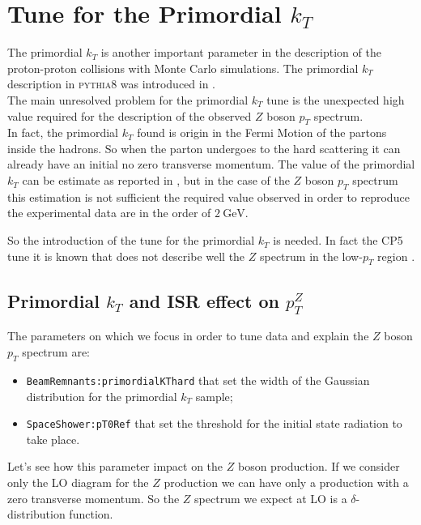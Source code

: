 \chapter{Tune for the Primordial $k_T$}
\label{chap:primordialkTtune}

The primordial $k_T$ is another important parameter in the description of the proton-proton collisions with Monte Carlo simulations. The primordial $k_T$ description in \textsc{pythia8} was introduced in .
\\
The main unresolved problem for the primordial $k_T$ tune is the unexpected high value required for the description of the observed $Z$ boson $p_T$ spectrum.
\\
In fact, the primordial $k_T$ found is origin in the Fermi Motion of the partons inside the hadrons. So when the parton undergoes to the hard scattering it can already have an initial no zero transverse momentum.
The value of the primordial $k_T$ can be estimate as reported in , but in the case of the $Z$ boson $p_T$ spectrum this estimation is not sufficient the required value observed in order to reproduce the experimental data are in the order of $2\ \mathrm{GeV}$.


So the introduction of the tune for the primordial $k_T$ is needed. In fact the CP5 tune it is known that does not describe well the $Z$ spectrum in the low-$p_T$ region \cite{CPtunes}.





\section{Primordial $k_T$ and ISR effect on $p_T^Z$}

The parameters on which we focus in order to tune data and explain the $Z$ boson $p_T$ spectrum are:
\begin{itemize}
\item \texttt{BeamRemnants:primordialKThard} that set the width of the Gaussian distribution for the primordial $k_T$ sample;
\item \texttt{SpaceShower:pT0Ref} that set the threshold for the initial state radiation to take place.
\end{itemize}
Let's see how this parameter impact on the $Z$ boson production. If we consider only the LO diagram for the $Z$ production we can have only a production with a zero transverse momentum. So the $Z$ spectrum we expect at LO is a $\delta$-distribution function.  

